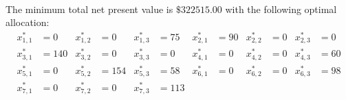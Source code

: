 \documentclass[a4paper,10 pt,titlepage,twoside]{book}
\theoremstyle{plain}
\theoremstyle{definition}
\theoremstyle{remark}
\begin{document}
\\
The minimum total net present value is $\$322515.00$ with the following optimal allocation:
\begin{align*}
x_{1,1}^{*} &=  0 & x_{1,2}^{*}&= 0 & x_{1,3}^{*} &= 75 & x_{2,1}^{*} &= 90 & x_{2,2}^{*} &= 0 & x_{2,3}^{*} &= 0\\
x_{3,1}^{*} &= 140 & x_{3,2}^{*}&= 0 & x_{3,3}^{*} &= 0 & x_{4,1}^{*} &= 0 & x_{4,2}^{*} &= 0 & x_{4,3}^{*} &= 60\\
x_{5,1}^{*} &= 0 & x_{5,2}^{*}&= 154 & x_{5,3}^{*} &= 58 & x_{6,1}^{*} &= 0 & x_{6,2}^{*} &= 0 & x_{6,3}^{*} &= 98\\
 x_{7,1}^{*}&=0 &x_{7,2}^{*} &= 0 & x_{7,3}^{*} &= 113 & & & &  & & \\
\end{align*}
\end{document}
